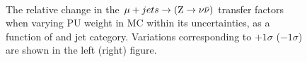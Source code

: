 \begin{figure}[!h]
  \centering
   ~~
  \\

  \caption{\label{fig:tfSyst_pu_muToZinv} The relative change in the
  $\mu + jets \rightarrow ({\text Z} \rightarrow \nu\bar{\nu})$ transfer
  factors when varying PU weight in MC within its uncertainties, as a function of \scalht and jet category. 
  Variations corresponding to $+1\sigma$ ($-1\sigma$) are shown in the left (right) figure. 
  }
\end{figure}

